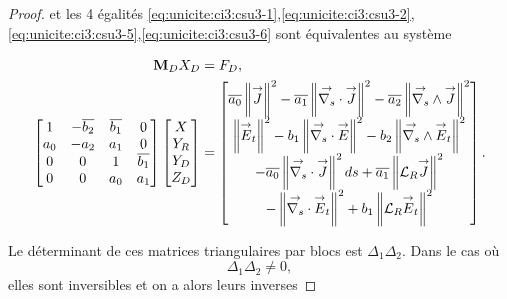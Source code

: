 \begin{proof}
    et les 4 égalités \eqref{eq:unicite:ci3:csu3-1},\eqref{eq:unicite:ci3:csu3-2},\eqref{eq:unicite:ci3:csu3-5},\eqref{eq:unicite:ci3:csu3-6} sont équivalentes au système

    \begin{align*}
      \mM_D  X_D & =  F_D,
      \\
      \begin{bmatrix}
        1 & -\conj{b_2} & \conj{b_1} & 0
        \\
        a_0 & -a_2 & a_1 & 0
        \\
        0 & 0 & 1 & \conj{b_1}
        \\
        0 & 0 & a_0 & a_1
      \end{bmatrix}
      \begin{bmatrix}
        X
        \\
        Y_R
        \\
        Y_D
        \\
        Z_D
      \end{bmatrix}
      & =
      \begin{bmatrix}
        \conj{a_0} \norm{\vJ}^2 - \conj{a_1} \norm{\vdivs \vJ}^2 - \conj{a_2} \norm{\vrots \vJ}^2
        \\
        \norm{\vE_t}^2   - b_1 \norm{\vdivs \vE }^2  - b_2 \norm{\vrots \vE_t}^2
        \\
        -\conj{a_0} \norm{\vdivs \vJ}^2ds + \conj{a_1} \norm{\LR \vJ}^2
        \\
        -\norm{\vdivs \vE_t}^2   + {b_1} \norm{\LR \vE_t}^2 
      \end{bmatrix}.
    \end{align*}

    Le déterminant de ces matrices triangulaires par blocs est \(\Delta_1\Delta_2\). Dans le cas où
    \begin{equation}
      \label{eq:unicite:ci3:csu3-cn-det}
      \Delta_1\Delta_2 \not = 0,
    \end{equation}
    elles sont inversibles et on a alors leurs inverses


\end{proof}
